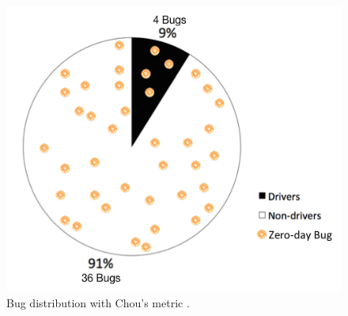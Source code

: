 \begin{figure}
\centering
\includegraphics[width=0.9\columnwidth]{diagram/metrics_drivers.png}
\caption{\small Bug distribution with Chou's metric \cite{PittSFIeld}.}
\label{fig:metrics_drivers}
\end{figure}